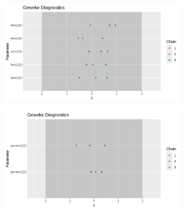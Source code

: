 \documentclass[12pt]{article}
\begin{document}
\begin{figure}[h!]
    \centering
    \begin{subfigure}{0.45\textwidth}
        \includegraphics[width=\linewidth]{pictures/mod2/mod2geweke_beta.png}
    \end{subfigure}
    \begin{subfigure}{0.45\textwidth}
        \includegraphics[width=\linewidth]{pictures/mod2/mod2geweke_gamma.png}
    \end{subfigure}


\end{figure}
\end{document}
